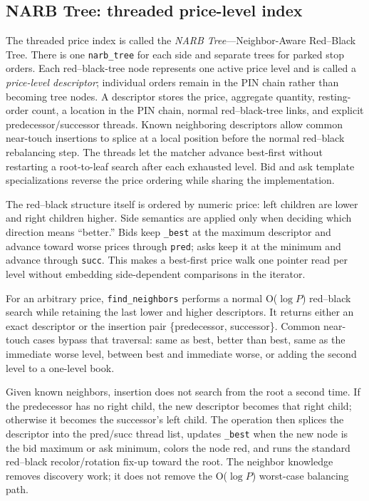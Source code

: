 \documentclass[10pt,twocolumn]{article}
\begin{document}
\subsection{NARB Tree: threaded price-level index}

The threaded price index is called the \emph{NARB Tree}---Neighbor-Aware
Red--Black Tree.  There is one \texttt{narb\_tree} for each side and separate
trees for parked stop orders.  Each red--black-tree node represents one active
price level and is called a \emph{price-level descriptor}; individual orders
remain in the PIN chain rather than becoming tree nodes.  A descriptor stores
the price, aggregate quantity, resting-order count, a location in the PIN chain,
normal red--black-tree links, and explicit predecessor/successor threads.
Known neighboring descriptors allow common near-touch insertions to splice at a
local position before the normal red--black rebalancing step.  The threads let
the matcher advance best-first
without restarting a root-to-leaf search after each exhausted level.  Bid and
ask template specializations reverse the price ordering while sharing the
implementation.

The red--black structure itself is ordered by numeric price: left children are
lower and right children higher.  Side semantics are applied only when deciding
which direction means ``better.''  Bids keep \texttt{\_best} at the maximum
descriptor and advance toward worse prices through \texttt{pred}; asks keep it
at the minimum and advance through \texttt{succ}.  This makes a best-first price
walk one pointer read per level without embedding side-dependent comparisons in
the iterator.

For an arbitrary price, \texttt{find\_neighbors} performs a normal O($\log P$)
red--black search while retaining the last lower and higher descriptors.  It
returns either an exact descriptor or the insertion pair
\{predecessor, successor\}.  Common near-touch cases bypass that traversal:
same as best, better than best, same as the immediate worse level, between best
and immediate worse, or adding the second level to a one-level book.

Given known neighbors, insertion does not search from the root a second time.
If the predecessor has no right child, the new descriptor becomes that right
child; otherwise it becomes the successor's left child.  The operation then
splices the descriptor into the pred/succ thread list, updates \texttt{\_best}
when the new node is the bid maximum or ask minimum, colors the node red, and
runs the standard red--black recolor/rotation fix-up toward the root.  The
neighbor knowledge removes discovery work; it does not remove the O($\log P$)
worst-case balancing path.
\end{document}
